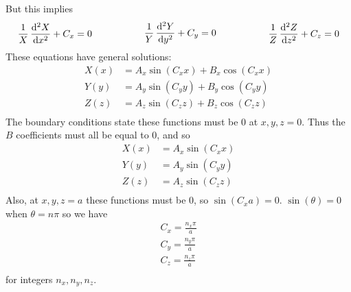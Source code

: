 \documentclass{scrartcl}
\begin{document}
But this implies
\begin{displaymath}
\begin{split}
\frac{1}{X}\dod[2]{X}{x} + C_x = 0 \hspace{0.75 in}
\end{split}
\begin{split}
\frac{1}{Y}\dod[2]{Y}{y} + C_y = 0 \hspace{0.75 in}
\end{split}
\begin{split}
\frac{1}{Z}\dod[2]{Z}{z} + C_z = 0
\end{split}
\end{displaymath}
These equations have general solutions:
\begin{align*}
X(x)&=A_x\sin(C_xx)+B_x\cos(C_xx)\\
Y(y)&=A_y\sin(C_yy)+B_y\cos(C_yy)\\
Z(z)&=A_z\sin(C_zz)+B_z\cos(C_zz)\\
\end{align*}
The boundary conditions state these functions must be 0 at $x,y,z=0$. Thus the $B$ coefficients must all be equal to 0, and so
\begin{align*}
X(x)&=A_x\sin(C_xx)\\
Y(y)&=A_y\sin(C_yy)\\
Z(z)&=A_z\sin(C_zz)\\
\end{align*}
Also, at $x,y,z=a$ these functions must be 0, so $\sin(C_xa)=0$. $\sin(\theta)=0$ when $\theta=n\pi$ so we have
\begin{align*}
C_x=\frac{n_x\pi}{a}\\
C_y=\frac{n_y\pi}{a}\\
C_z=\frac{n_z\pi}{a}\\
\end{align*}
for integers $n_x, n_y, n_z$.
\end{document}
